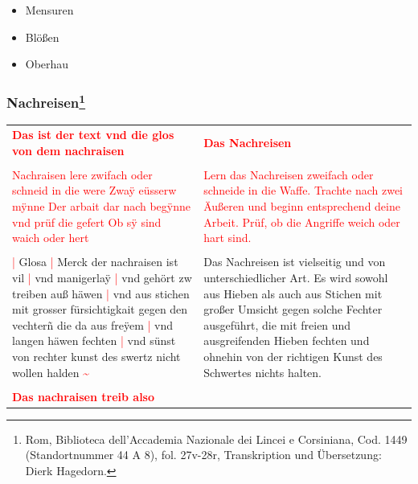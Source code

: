 \begin{itemize}
    \item Mensuren
    \item Blößen
    \item Oberhau
\end{itemize}

\newpage

\subsubsection[Nachreisen]{
    Nachreisen\footnote{
        \hspace*{0.5ex}Rom, Biblioteca dell'Accademia Nazionale dei Lincei e Corsiniana,
        Cod. 1449 (Standortnummer 44 A 8), fol. 27v-28r, Transkription und Übersetzung: Dierk Hagedorn.}}

\begin{longtable}{p{6.25cm}p{6.25cm}}
    \textbf{\textcolor{red}{
        Das ist der text vnd die glos von dem nachraisen}}
    &
    \textbf{\textcolor{red}{
        Das Nachreisen}}
    \\
    \\
    \textcolor{red}{
        Nachraisen lere zwifach oder schneid in die were
        Zwaÿ eüsserw mÿnne Der arbait dar nach begÿnne
        vnd prüf die gefert Ob sÿ sind waich oder hert}
    &
    \textcolor{red}{
        Lern das Nachreisen zweifach oder schneide in die Waffe.
        Trachte nach zwei Äußeren und beginn entsprechend deine Arbeit.
        Prüf, ob die Angriffe weich oder hart sind.}
    \\
    \\
    \textcolor{red}{|} Glosa
    \textcolor{red}{|} Merck der nachraisen ist vil
    \textcolor{red}{|} vnd manigerlaÿ
    \textcolor{red}{|} vnd gehört zw treiben auß häwen
    \textcolor{red}{|} vnd aus stichen mit grosser fürsichtigkait gegen den vechterñ die da aus freÿem
    \textcolor{red}{|} vnd langen häwen fechten
    \textcolor{red}{|} vnd sünst von rechter kunst des swertz nicht wollen halden \textcolor{red}{\textasciitilde{}}
    &
    Das Nachreisen ist vielseitig und von unterschiedlicher Art.
    Es wird sowohl aus Hieben als auch aus Stichen mit großer Umsicht gegen solche Fechter ausgeführt, die mit freien und ausgreifenden Hieben fechten und ohnehin von der richtigen Kunst des Schwertes nichts halten.
    \\
    \\
    \textbf{\textcolor{red}{
        Das nachraisen treib also}}
    &
    \textbf{\textcolor{red}{
}}
\end{longtable}
